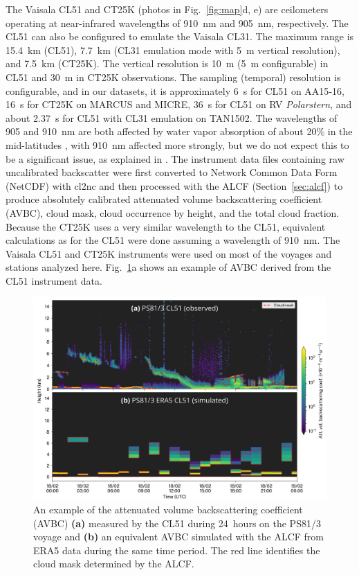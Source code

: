\documentclass[draft]{agujournal2019}
\begin{document}
The Vaisala CL51 and CT25K (photos in Fig.~\ref{fig:map}d, e) are ceilometers operating at near-infrared wavelengths of 910~nm and 905~nm, respectively. The CL51 can also be configured to emulate the Vaisala CL31. The maximum range is 15.4~km (CL51), 7.7~km (CL31 emulation mode with 5~m vertical resolution), and 7.5~km (CT25K). The vertical resolution is 10~m (5~m configurable) in CL51 and 30~m in CT25K observations. The sampling (temporal) resolution is configurable, and in our datasets, it is approximately 6~s for CL51 on AA15‐16, 16~s for CT25K on MARCUS and MICRE, 36~s for CL51 on RV \emph{Polarstern}, and about 2.37~s for CL51 with CL31 emulation on TAN1502. The wavelengths of 905 and 910~nm are both affected by water vapor absorption of about 20\% in the mid-latitudes \cite{wiegner2015,wiegner2019}, with 910~nm affected more strongly, but we do not expect this to be a significant issue, as explained in . The instrument data files containing raw uncalibrated backscatter were first converted to Network Common Data Form (NetCDF) with cl2nc \cite{kuma2024a} and then processed with the ALCF (Section~\ref{sec:alcf}) to produce absolutely calibrated attenuated volume backscattering coefficient (AVBC), cloud mask, cloud occurrence by height, and the total cloud fraction. Because the CT25K uses a very similar wavelength to the CL51, equivalent calculations as for the CL51 were done assuming a wavelength of 910~nm. The Vaisala CL51 and CT25K instruments were used on most of the voyages and stations analyzed here. Fig.~\ref{fig:example}a shows an example of AVBC derived from the CL51 instrument data.

\begin{figure}[b!]
\centering
\includegraphics[width=\textwidth]{img/example.png}
\caption{
An example of the attenuated volume backscattering coefficient (AVBC) \textbf{(a)} measured by the CL51 during 24~hours on the PS81/3 voyage and \textbf{(b)} an equivalent AVBC simulated with the ALCF from ERA5 data during the same time period. The red line identifies the cloud mask determined by the ALCF.
}
\label{fig:example}
\end{figure}
\end{document}
